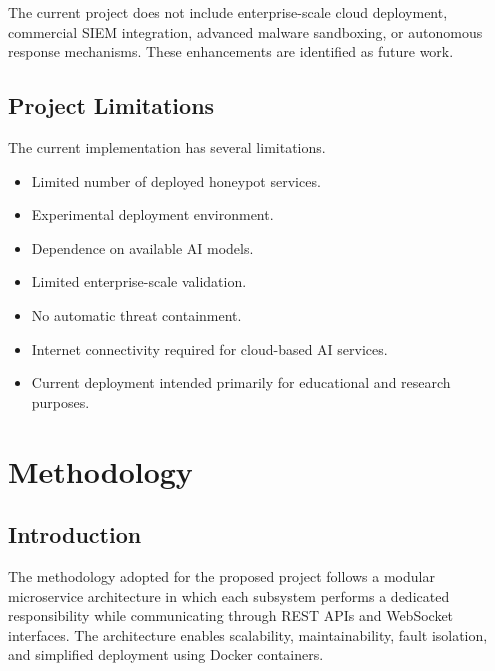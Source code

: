 \documentclass[12pt,a4paper]{report}
\begin{document}
The current project does not include enterprise-scale cloud deployment, commercial SIEM integration, advanced malware sandboxing, or autonomous response mechanisms. These enhancements are identified as future work.


\section*{Project Limitations}

The current implementation has several limitations.

\begin{itemize}
\item Limited number of deployed honeypot services.
\item Experimental deployment environment.
\item Dependence on available AI models.
\item Limited enterprise-scale validation.
\item No automatic threat containment.
\item Internet connectivity required for cloud-based AI services.
\item Current deployment intended primarily for educational and research purposes.
\end{itemize}

\clearpage


\chapter{Methodology}

\section{Introduction}

The methodology adopted for the proposed project follows a modular microservice architecture in which each subsystem performs a dedicated responsibility while communicating through REST APIs and WebSocket interfaces. The architecture enables scalability, maintainability, fault isolation, and simplified deployment using Docker containers.
\end{document}
